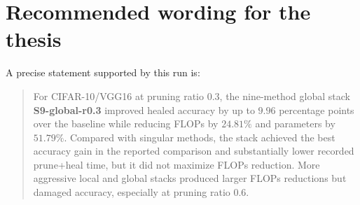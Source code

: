 \documentclass[11pt]{article}
\newcommand{\stackname}[1]{\textbf{#1}}
\begin{document}
\section*{Recommended wording for the thesis}
A precise statement supported by this run is:
\begin{quote}
For CIFAR-10/VGG16 at pruning ratio $0.3$, the nine-method global stack \stackname{S9-global-r0.3} improved healed accuracy by up to $9.96$ percentage points over the baseline while reducing FLOPs by $24.81\%$ and parameters by $51.79\%$.  Compared with singular methods, the stack achieved the best accuracy gain in the reported comparison and substantially lower recorded prune+heal time, but it did not maximize FLOPs reduction.  More aggressive local and global stacks produced larger FLOPs reductions but damaged accuracy, especially at pruning ratio $0.6$.
\end{quote}
\end{document}
